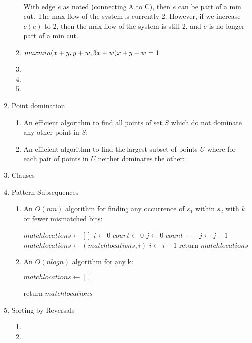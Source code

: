 \documentclass[a4paper]{article}
\begin{document}
\begin{enumerate}
\begin{enumerate}
\\
		With edge $e$ as noted (connecting A to C), then $e$ can be part of a min cut.  The max flow of the system is currently 2.  However, if we increase $c(e)$ to 2, then the max flow of the system is still 2, and $e$ is no longer part of a min cut.
	\item $max min(x+y,y+w,3x+w)\\x+y+w=1$
	\item 
	\item
	\item
	\end{enumerate}
\item Point domination
	\begin{enumerate}
	\item An efficient algorithm to find all points of set $S$ which do not dominate any other point in $S$:
	\item An efficient algorithm to find the largest subset of points $U$ where for each pair of points in $U$ neither dominates the other:
	\end{enumerate}
\item Clauses
\item Pattern Subsequences
	\begin{enumerate}
	\item An $O(nm)$ algorithm for finding any occurrence of $s_1$ within $s_2$ with $k$ or fewer mismatched bits:\\
		\begin{algorithmic}
		\State $matchlocations \gets [ ]$
		\State $i \gets 0$
			\State $count \gets 0$
			\State $j \gets 0$
					\State $count++$
				\EndIf
				\State $j \gets j + 1$
			\EndFor
				\State $matchlocations \gets (matchlocations, i)$
			\EndIf
			\State $i \gets i + 1$
		\EndFor
		\State return $matchlocations$
		\end{algorithmic}
	\item An $O(n log n)$ algorithm for any k:
		\begin{algorithmic}
		\State $matchlocations \gets [ ]$
		
		\State return $matchlocations$
		\end{algorithmic}
	\end{enumerate}
\item Sorting by Reversals
	\begin{enumerate}
	\item
	\item
	\end{enumerate}
\end{enumerate}
\end{document}

